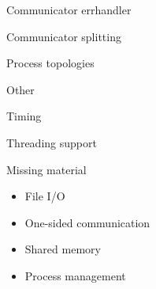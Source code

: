 \documentclass[11pt,headernav]{beamer}
\begin{document}
\begin{frame}[containsverbatim]{Communicator errhandler}
  
\end{frame}
\begin{frame}[containsverbatim]{Communicator splitting}
  
\end{frame}

 {Process topologies}

 {Other}

\begin{frame}[containsverbatim]{Timing}
  
\end{frame}

\begin{frame}[containsverbatim]{Threading support}
  
\end{frame}

\begin{frame}{Missing material}
  \begin{itemize}
  \item File I/O
  \item One-sided communication
  \item Shared memory
  \item Process management
  \end{itemize}
\end{frame}

\begin{comment}
  \Level 0 {MPI File I/O}
  \Level 0 {One-sided communication}
  \Level 0 {Shared memory}
  \Level 0 {Process management}
\end{comment}
\end{document}
